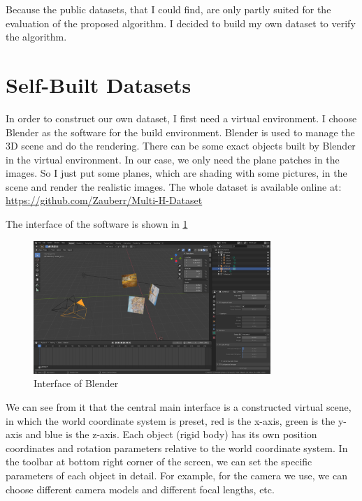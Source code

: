 Because the public datasets, that I could find, are only partly suited for the evaluation of the proposed algorithm. I decided to build my own dataset to verify the algorithm.
\section{Self-Built Datasets} \label{sec:Self-Built Datasets}
In order to construct our own dataset, I first need a virtual environment. I choose Blender as the software for the build environment. Blender is used to manage the 3D scene and do the rendering. There can be some exact objects built by Blender in the virtual environment. In our case, we only need the plane patches in the images. So I just put some planes, which are shading with some pictures, in the scene and render the realistic images. The whole dataset is available online at: \url{https://github.com/Zauberr/Multi-H-Dataset}

The interface of the software is shown in \cref{fig:Interface of Blender}
\begin{figure}[htbp]
	\centering
	\includegraphics[width=0.80\textwidth]{images/Blender/software_interface.png}
	\caption{Interface of Blender}
	\label{fig:Interface of Blender}
\end{figure}

We can see from it that the central main interface is a constructed virtual scene, in which the world coordinate system is preset, red is the x-axis, green is the y-axis and blue is the z-axis. Each object (rigid body) has its own position coordinates and rotation parameters relative to the world coordinate system. In the toolbar at bottom right corner of the screen, we can set the specific parameters of each object in detail. For example, for the camera we use, we can choose different camera models and different focal lengths, etc.

